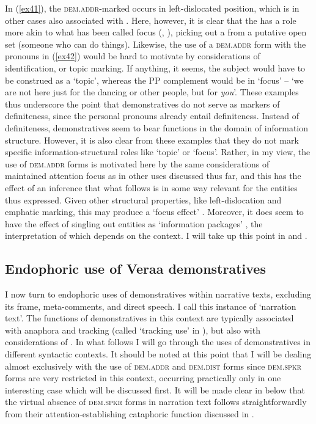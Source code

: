 \documentclass[output=paper
,modfonts
,nonflat]{langsci/langscibook}
\begin{document}
\noindent
In (\ref{ex41}), the \textsc{dem.addr}-marked  occurs in left-dislocated position, which is in other cases also associated with . Here, however, it is clear that the  has a role more akin to what has been called focus (\citealt{Krifka2008}, \citealt{Lambrecht1994}), picking out a  from a putative open set (someone who can do things). Likewise, the use of a \textsc{dem.addr} form with the pronouns in (\ref{ex42}) would be hard to motivate by considerations of identification, or topic marking. If anything, it seems, the subject  would have to be construed as a `topic', whereas the PP complement would be in `focus' -- `we are not here just for the dancing or other people, but for \emph{you}'. These examples thus underscore the point that demonstratives do not serve as markers of definiteness, since the personal pronouns already entail definiteness. Instead of definiteness, demonstratives seem to bear functions in the domain of information structure. However, it is also clear from these examples that they do not mark specific information-structural roles like `topic' or `focus'. Rather, in my view, the use of \textsc{dem.addr} forms is motivated here by the same considerations of maintained attention focus as in other uses discussed thus far, and this has the effect of an inference that what follows is in some way relevant for the entities thus expressed. Given other structural properties, like left-dislocation and emphatic marking, this may produce a `focus effect' \citep{MaticWedgwood2013}. Moreover, it does seem to have the effect of singling out entities as `information packages' \citep{Ozerov2015}, the interpretation of which depends on the  context. I will take up this point in  and .

\subsection{Endophoric use of Vera{\textquotesingle}a demonstratives}	\label{demvraendouse}
I now turn to endophoric uses of demonstratives within narrative texts, excluding its frame, meta-comments, and direct speech. I call this instance of  `narration text'. The functions of demonstratives in this context are typically associated with anaphora and  tracking (called `tracking use' in \citealt{Himmelmann1996}), but also with considerations of  \citep{Diessel1999}. In what follows I will go through the uses of demonstratives in different syntactic contexts. It should be noted at this point that I will be dealing almost exclusively with the use of \textsc{dem.addr} and \textsc{dem.dist} forms since \textsc{dem.spkr} forms are very restricted in this context, occurring practically only in one interesting case which will be discussed first. It will be made clear in  below that the virtual absence of \textsc{dem.spkr} forms in narration text follows straightforwardly from their attention-establishing cataphoric function discussed in .
\end{document}
